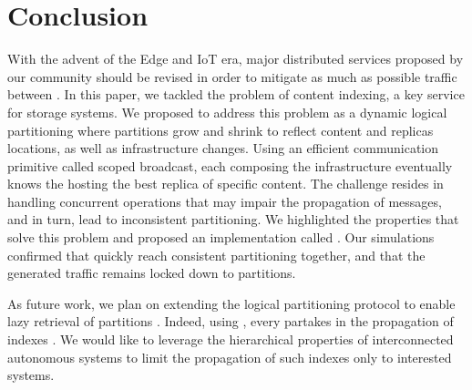 \section{Conclusion}
\label{sec:conclusion}

With the advent of the Edge and IoT era, major distributed services
proposed by our community should be revised in order to mitigate as
much as possible traffic between \processes.  In this paper, we
tackled the problem of content indexing, a key service for storage
systems.
%
We proposed to address this problem as a dynamic logical partitioning
where partitions grow and shrink to reflect content and replicas
locations, as well as infrastructure changes. Using an efficient
communication primitive called scoped broadcast, each \process
composing the infrastructure eventually knows the \process hosting the
best replica of specific content.  The challenge resides in handling
concurrent operations that may impair the propagation of messages, and
in turn, lead to inconsistent partitioning.
%
We highlighted the properties that solve this problem and proposed an
implementation called \NAME.  Our simulations confirmed that
\processes quickly reach consistent partitioning together, and that
the generated traffic remains locked down to partitions.

As future work, we plan on extending the logical partitioning protocol
to enable lazy retrieval of partitions . Indeed, using \NAME, every \process partakes
in the propagation of indexes . We would like to leverage the hierarchical properties of
interconnected autonomous systems to limit the propagation of such
indexes only to interested systems.

%
%
%


